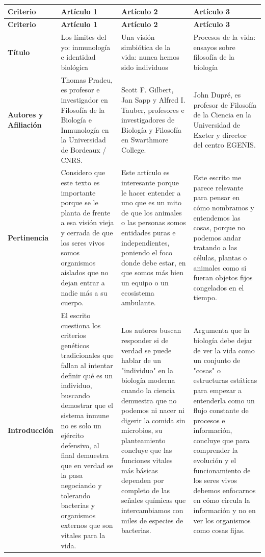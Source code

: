 \documentclass[12pt]{article}
\begin{document}
\begin{longtable}{|>{\raggedright\arraybackslash}p{3cm}|>{\raggedright\arraybackslash}p{4.2cm}|>{\raggedright\arraybackslash}p{4.2cm}|>{\raggedright\arraybackslash}p{4.2cm}|}
\hline
\textbf{Criterio} & \textbf{Artículo 1} & \textbf{Artículo 2} & \textbf{Artículo 3} \\
\hline
\endfirsthead

\hline
\textbf{Criterio} & \textbf{Artículo 1} & \textbf{Artículo 2} & \textbf{Artículo 3} \\
\hline
\endhead

\textbf{Título} & Los límites del yo: inmunología e identidad biológica & Una visión simbiótica de la vida: nunca hemos sido individuos & Procesos de la vida: ensayos sobre filosofía de la biología \\
\hline
\textbf{Autores y Afiliación} & Thomas Pradeu, es profesor e investigador en Filosofía de la Biología e Inmunología en la Universidad de Bordeaux / CNRS. & Scott F. Gilbert, Jan Sapp y Alfred I. Tauber, profesores e investigadores de Biología y Filosofía en Swarthmore College. & John Dupré, es profesor de Filosofía de la Ciencia en la Universidad de Exeter y director del centro EGENIS. \\
\hline
\textbf{Pertinencia} & Considero que este texto es importante porque se le planta de frente a esa visión vieja y cerrada de que los seres vivos somos organismos aislados que no dejan entrar a nadie más a su cuerpo. & Este artículo es interesante porque le hacer entender a uno que es un mito de que los animales o las personas somos entidades puras e independientes, poniendo el foco donde debe estar, en que somos más bien un equipo o un ecosistema ambulante. & Este escrito me parece relevante para pensar en cómo nombramos y entendemos las cosas, porque no podemos andar tratando a las células, plantas o animales como si fueran objetos fijos congelados en el tiempo. \\
\hline
\textbf{Introducción} & El escrito cuestiona los criterios genéticos tradicionales que fallan al intentar definir qué es un individuo, buscando demostrar que el sistema inmune no es solo un ejército defensivo, al final demuestra que en verdad se la pasa negociando y tolerando bacterias y organismos externos que son vitales para la vida. & Los autores buscan responder si de verdad se puede hablar de un "individuo" en la biología moderna cuando la ciencia demuestra que no podemos ni nacer ni digerir la comida sin microbios, su planteamiento concluye que las funciones vitales más básicas dependen por completo de las señales químicas que intercambiamos con miles de especies de bacterias. & Argumenta que la biología debe dejar de ver la vida como un conjunto de "cosas" o estructuras estáticas para empezar a entenderla como un flujo constante de procesos e información, concluye que para comprender la evolución y el funcionamiento de los seres vivos debemos enfocarnos en cómo circula la información y no en ver los organismos como cosas fijas. \\

\end{longtable}
\end{document}

